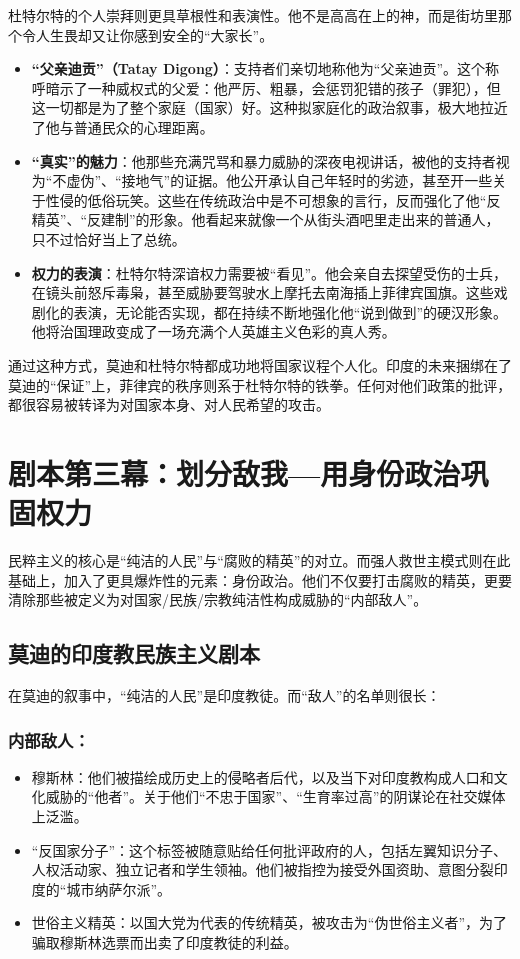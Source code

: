 杜特尔特的个人崇拜则更具草根性和表演性。他不是高高在上的神，而是街坊里那个令人生畏却又让你感到安全的``大家长''。
\begin{itemize}
\item \textbf{``父亲迪贡''（Tatay Digong）}：支持者们亲切地称他为``父亲迪贡''。这个称呼暗示了一种威权式的父爱：他严厉、粗暴，会惩罚犯错的孩子（罪犯），但这一切都是为了整个家庭（国家）好。这种拟家庭化的政治叙事，极大地拉近了他与普通民众的心理距离。
\item \textbf{``真实''的魅力}：他那些充满咒骂和暴力威胁的深夜电视讲话，被他的支持者视为``不虚伪''、``接地气''的证据。他公开承认自己年轻时的劣迹，甚至开一些关于性侵的低俗玩笑。这些在传统政治中是不可想象的言行，反而强化了他``反精英''、``反建制''的形象。他看起来就像一个从街头酒吧里走出来的普通人，只不过恰好当上了总统。
\item \textbf{权力的表演}：杜特尔特深谙权力需要被``看见''。他会亲自去探望受伤的士兵，在镜头前怒斥毒枭，甚至威胁要驾驶水上摩托去南海插上菲律宾国旗。这些戏剧化的表演，无论能否实现，都在持续不断地强化他``说到做到''的硬汉形象。他将治国理政变成了一场充满个人英雄主义色彩的真人秀。
\end{itemize}
通过这种方式，莫迪和杜特尔特都成功地将国家议程个人化。印度的未来捆绑在了莫迪的``保证''上，菲律宾的秩序则系于杜特尔特的铁拳。任何对他们政策的批评，都很容易被转译为对国家本身、对人民希望的攻击。

\section{剧本第三幕：划分敌我---用身份政治巩固权力}
民粹主义的核心是``纯洁的人民''与``腐败的精英''的对立。而强人救世主模式则在此基础上，加入了更具爆炸性的元素：身份政治。他们不仅要打击腐败的精英，更要清除那些被定义为对国家/民族/宗教纯洁性构成威胁的``内部敌人''。

\subsection{莫迪的印度教民族主义剧本}

在莫迪的叙事中，``纯洁的人民''是印度教徒。而``敌人''的名单则很长：

\subsubsection{内部敌人：}
\begin{itemize}
\item 穆斯林：他们被描绘成历史上的侵略者后代，以及当下对印度教构成人口和文化威胁的``他者''。关于他们``不忠于国家''、``生育率过高''的阴谋论在社交媒体上泛滥。
\item ``反国家分子''：这个标签被随意贴给任何批评政府的人，包括左翼知识分子、人权活动家、独立记者和学生领袖。他们被指控为接受外国资助、意图分裂印度的``城市纳萨尔派''。
\item 世俗主义精英：以国大党为代表的传统精英，被攻击为``伪世俗主义者''，为了骗取穆斯林选票而出卖了印度教徒的利益。
\end{itemize}

